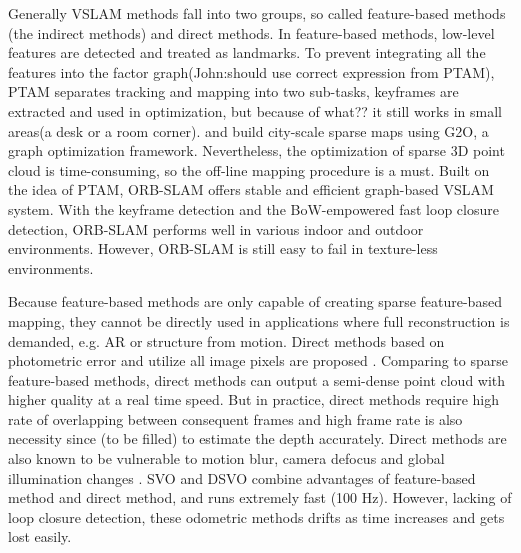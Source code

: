 \documentclass[journal]{IEEEtran}
\begin{document}

Generally VSLAM methods fall into two groups, so called feature-based methods (the indirect methods) and direct methods. 
In feature-based methods, low-level features are detected and treated as landmarks. 
To prevent integrating all the features into the factor graph(John:should use correct expression from PTAM), PTAM\cite{Klein2007Parallel} separates tracking and mapping into two sub-tasks, keyframes are extracted and used in optimization, but because of what?? it still works in small areas(a desk or a room corner). 
\cite{Lategahn2012City} and \cite{Lategahn2014Vision} build city-scale sparse maps using G2O, a graph optimization framework\citep{K2011G2o}. 
Nevertheless, the optimization of sparse 3D point cloud is time-consuming, so the off-line mapping procedure is a must. Built on the idea of PTAM\cite{Klein2007Parallel}, ORB-SLAM \cite{Mur2017ORB} offers stable and efficient graph-based VSLAM system.
With the keyframe detection and the BoW-empowered fast loop closure detection, ORB-SLAM performs well in various indoor and outdoor environments. 
However, ORB-SLAM is still easy to fail in texture-less environments.

%

Because feature-based methods are only capable of creating sparse feature-based mapping, they cannot be directly used in applications where full reconstruction is demanded, e.g. AR or structure from motion.
Direct methods based on photometric error and utilize all image pixels are proposed \citep{Engel2014LSD}.
Comparing to sparse feature-based methods, direct methods can output a semi-dense point cloud with higher quality at a real time speed. 
But in practice, direct methods require high rate of overlapping between consequent frames and high frame rate is also necessity since (to be filled) to estimate the depth accurately.
Direct methods are also known to be vulnerable to motion blur, camera defocus and global illumination changes \cite{Newcombe2011DTAM}. 
SVO \cite{Forster2013SVO} and DSVO\cite{} combine advantages of feature-based method and direct method, and runs extremely fast (100 Hz). 
However, lacking of loop closure detection, these odometric methods drifts as time increases and gets lost easily.
	
\end{document}

